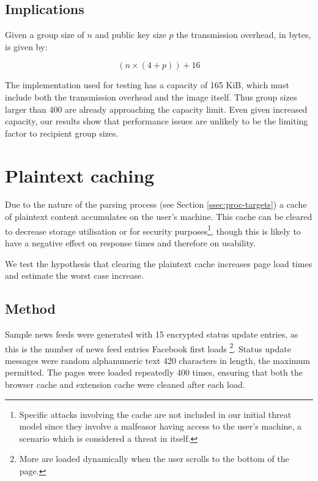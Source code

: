 \subsection{Implications}

Given a group size of $n$ and public key size $p$ the transmission overhead, in bytes, is given by:

\begin{equation}
    (n \times (4 + p)) + 16
\end{equation}

The implementation used for testing has a capacity of 165 KiB, which must include both the transmission overhead and the image itself. Thus group sizes larger than 400 are already approaching the capacity limit. Even given increased capacity, our results show that performance issues are unlikely to be the limiting factor to recipient group sizes.


\section{Plaintext caching}
\label{sec:ptextc}

Due to the nature of the parsing process (see Section \ref{ssec:proc-targets}) a cache of plaintext content accumulates on the user's machine. This cache can be cleared to decrease storage utilisation or for security purposes\footnote{Specific attacks involving the cache are not included in our initial threat model since they involve a malfeasor having access to the user's machine, a scenario which is considered a threat in itself.}, though this is likely to have a negative effect on response times and therefore on usability.

We test the hypothesis that clearing the plaintext cache increases page load times and estimate the worst case increase.


\subsection{Method}

Sample news feeds were generated with 15 encrypted status update entries, as this is the number of news feed entries Facebook first loads \footnote{More are loaded dynamically when the user scrolls to the bottom of the page.}. Status update messages were random alphanumeric text 420 characters in length, the maximum permitted. The pages were loaded repeatedly 400 times, ensuring that both the browser cache and extension cache were cleaned after each load.

